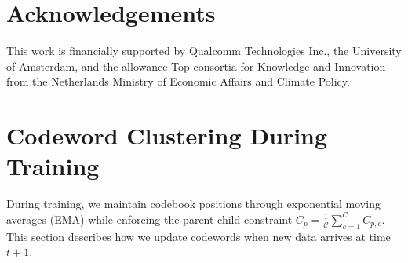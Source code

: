 \begin{abstract}
The $\mathcal{O}(N^2)$ complexity of attention over $N$ tokens remains a computational bottleneck in transformer models. Vector-Quantized (VQ) attention reduces this to $\mathcal{O}(MN)$ by representing keys with $M$ codewords, but applies uniform codebook capacity regardless of where attention mass concentrates: high-attention regions of key space may be coarsely approximated while low-attention regions waste representational capacity. We propose Adaptive Vector-Quantized (AVQ) Attention, which adaptively allocates codebook capacity based on attention importance. Starting from a small set of codewords, our method identifies the most important codes during the forward pass and refines them with pre-learned child codewords, achieving fine-grained quantization where it matters most while maintaining coarse quantization elsewhere.
We develop an implementation using custom Triton kernels that enables the full adaptive refinement process, including importance scoring, child codeword insertion, and parent contribution replacement, to be carried out within the tiled computation paradigm of Flash Attention with minimal overhead. Our approach maintains $\mathcal{O}(MN)$ complexity while achieving improved accuracy-efficiency trade-offs compared to fixed-codebook VQ-attention.
\end{abstract}








\section*{Acknowledgements}
This work is financially supported by Qualcomm Technologies Inc., the University of Amsterdam, and the allowance Top consortia for Knowledge and Innovation from the Netherlands Ministry of Economic Affairs and Climate Policy.




\newpage
\appendix




\section{Codeword Clustering During Training}
\label{app:codewordtraining}
During training, we maintain codebook positions through exponential moving averages (EMA) while enforcing the parent-child constraint $C_p = \frac{1}{\mathcal{C}}\sum_{c=1}^{\mathcal{C}} C_{p,c}$. This section describes how we update codewords when new data arrives at time $t+1$.

